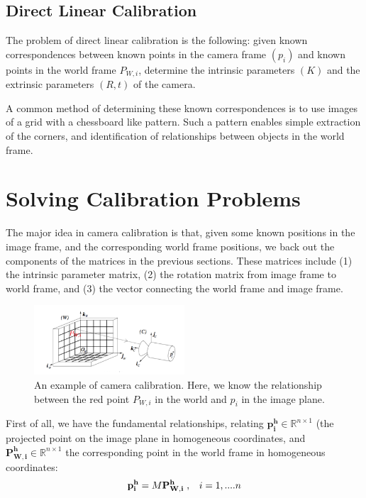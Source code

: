 \documentclass[]{article}
\begin{document}
\subsection{Direct Linear Calibration}
The problem of direct linear calibration is the following: given known correspondences between known points in the camera frame $(p_i)$ and known points in the world frame $P_{W,i}$, determine the intrinsic parameters $(K)$ and the extrinsic parameters $(R,t)$ of the camera.

A common method of determining these known correspondences is to use images of a grid with a chessboard like pattern. Such a pattern enables simple extraction of the corners, and identification of relationships between objects in the world frame.


\section{Solving Calibration Problems}

The major idea in camera calibration is that, given some known positions in the image frame, and the corresponding world frame positions, we back out the components of the matrices in the previous sections. These matrices include (1) the intrinsic parameter matrix, (2) the rotation matrix from image frame to world frame, and (3) the vector connecting the world frame and image frame.\\

\begin{figure}[H]
\includegraphics[width=0.5\textwidth]{vik_image_4.png}
\centering
\caption{An example of camera calibration. Here, we know the relationship between the red point $P_{W,i}$ in the world and $p_i$ in the image plane.}
\label{fig:calibration}
\end{figure}

First of all, we have the fundamental relationships, relating $\mathbf{p_i^h} \in \mathbb{R}^{n \times 1}$ (the projected point on the image plane in homogeneous coordinates, and $\mathbf{P_{W,i}^h} \in \mathbb{R}^{n \times 1}$ the corresponding point in the world frame in homogeneous coordinates:
\begin{equation}
    \mathbf{p_i^h} = M \mathbf{P_{W,i}^{h}}\hspace{1mm}, \hspace{3mm}i = 1,....n
\end{equation}
\end{document}

